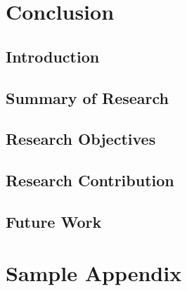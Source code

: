 \documentclass[]{nucthesis}
\begin{document}
\chapter{Conclusion}
\guideconclusion %
\section{Introduction}
\section{Summary of Research}
\section{Research Objectives}
\section{Research Contribution}
\section{Future Work}


%  




\appendix
\chapter{Sample Appendix}

\end{document}
